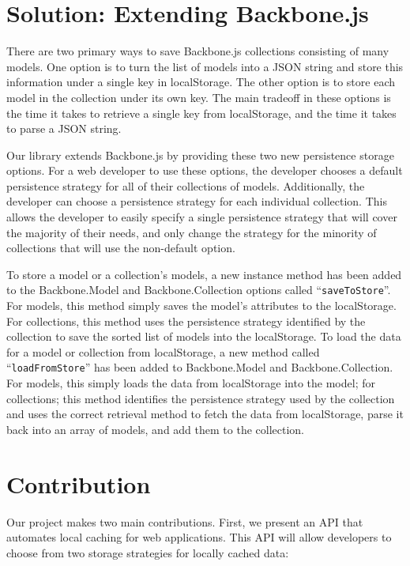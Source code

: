 \documentclass[12pt]{article}
\begin{document}
\section{Solution: Extending Backbone.js}

There are two primary ways to save Backbone.js collections consisting of many
models. One option is to turn the list of models into a JSON string and store
this information under a single key in localStorage. The other option is to
store each model in the collection under its own key. The main tradeoff in
these options is the time it takes to retrieve a single key from localStorage,
and the time it takes to parse a JSON string.

Our library extends Backbone.js by providing these two new persistence storage
options. For a web developer to use these options, the developer chooses a
default persistence strategy for all of their collections of models.
Additionally, the developer can choose a persistence strategy for each
individual collection. This allows the developer to easily specify a single
persistence strategy that will cover the majority of their needs, and only
change the strategy for the minority of collections that will use the
non-default option.

To store a model or a collection's models, a new instance method has been added
to the Backbone.Model and Backbone.Collection options called
``\verb=saveToStore=''. For models, this method simply saves the model's
attributes to the localStorage. For collections, this method uses the
persistence strategy identified by the collection to save the sorted list of
models into the localStorage. To load the data for a model or collection from
localStorage, a new method called ``\verb=loadFromStore='' has been added to
Backbone.Model and Backbone.Collection. For models, this simply loads the data
from localStorage into the model; for collections; this method identifies the
persistence strategy used by the collection and uses the correct retrieval
method to fetch the data from localStorage, parse it back into an array of
models, and add them to the collection.

\section{Contribution}

Our project makes two main contributions. First, we present an API that
automates local caching for web applications. This API will allow developers to
choose from two storage strategies for locally cached data:
\end{document}
